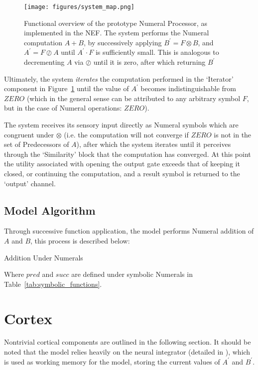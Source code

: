 \documentclass{report}
\begin{document}
\begin{figure}[H]
\centering
\texttt{[image: figures/system\_map.png]}
\caption{Functional overview of the prototype Numeral Processor, as implemented in the NEF. The system performs the Numeral computation $A + B$, by successively applying $B^\prime = F \otimes B$, and $A^\prime = F \oslash A$ until $A^\prime \cdot F$ is sufficiently small. This is analogous to decrementing $A$ via $\oslash$ until it is zero, after which returning $B^\prime$}
\label{fig:system_map}
\end{figure}

Ultimately, the system \emph{iterates} the computation performed in the \lq{}Iterator\rq{} component in Figure~\ref{fig:system_map} until the value of $A^\prime$ becomes indistinguishable from $ZERO$ (which in the general sense can be attributed to any arbitrary symbol $F$, but in the case of Numeral operations: $ZERO$).

The system receives its sensory input directly as Numeral symbols which are congruent under $\otimes$ (i.e. the computation will not converge if $ZERO$ is not in the set of Predecessors of $A$), after which the system iterates until it perceives through the \lq{}Similarity\rq{} block that the computation has converged.
At this point the utility associated with opening the output gate exceeds that of keeping it closed, or continuing the computation, and a result symbol is returned to the \lq{}output\rq{} channel.

\subsection{Model Algorithm}

Through successive function application, the model performs Numeral addition of $A$ and $B$, this process is described below:

\begin{algorithm}[htd]
\caption{Addition Under Numerals}
\end{algorithm}

Where $pred$ and $succ$ are defined under symbolic Numerals in Table~\ref{tab:symbolic_functions}.

\section{Cortex}
Nontrivial cortical components are outlined in the following section.
It should be noted that the model relies heavily on the neural integrator (detailed in \cite{bekolay2014,stewart2011a}), which is used as working memory for the model, storing the current values of $A^\prime$ and $B^\prime$.
\end{document}
